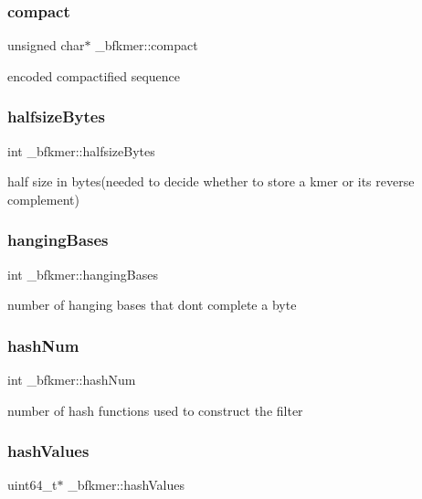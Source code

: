 \subsubsection{\texorpdfstring{compact}{compact}}
{\footnotesize\ttfamily unsigned char$\ast$ \+\_\+bfkmer\+::compact}

encoded compactified sequence \mbox{\label{struct__bfkmer_a8bb57e85f90ed06b9de391be9eeba3e8}} 
\subsubsection{\texorpdfstring{halfsize\+Bytes}{halfsizeBytes}}
{\footnotesize\ttfamily int \+\_\+bfkmer\+::halfsize\+Bytes}

half size in bytes(needed to decide whether to store a kmer or its reverse complement) \mbox{\label{struct__bfkmer_a151a92f8ca72f2d778f9ad26e96b35ae}} 
\subsubsection{\texorpdfstring{hanging\+Bases}{hangingBases}}
{\footnotesize\ttfamily int \+\_\+bfkmer\+::hanging\+Bases}

number of hanging bases that don\textquotesingle{}t complete a byte \mbox{\label{struct__bfkmer_a5694e46bd18449baa91d25178d1634bf}} 
\subsubsection{\texorpdfstring{hash\+Num}{hashNum}}
{\footnotesize\ttfamily int \+\_\+bfkmer\+::hash\+Num}

number of hash functions used to construct the filter \mbox{\label{struct__bfkmer_afa4bc228a6d89c923dbda0357071187a}} 
\subsubsection{\texorpdfstring{hash\+Values}{hashValues}}
{\footnotesize\ttfamily uint64\+\_\+t$\ast$ \+\_\+bfkmer\+::hash\+Values}

